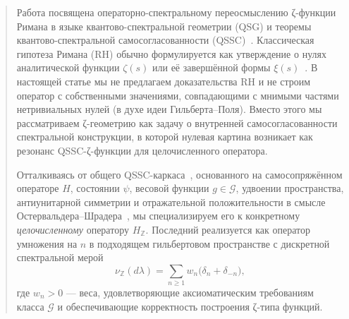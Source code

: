 \documentclass{article}
\numberwithin{equation}{section}
\theoremstyle{plain}
\theoremstyle{definition}
\theoremstyle{remark}
\def\delta{δ}\def\Delta{Δ}\def\epsilon{ε}\def\zeta{ζ}%
\begin{document}
\begin{abstract}
\noindent
Работа посвящена операторно-спектральному переосмыслению ζ-функции Римана в языке квантово-спектральной геометрии (QSG) и теоремы квантово-спектральной самосогласованности (QSSC)~\cite{ReedSimonI,ReedSimonII,Connes1994,Monakhov-QSG-002}. 
Классическая гипотеза Римана (RH) обычно формулируется как утверждение о нулях аналитической функции $\zeta(s)$ или её завершённой формы $\xi(s)$~\cite{Titchmarsh1986,IwaniecKowalski}. 
В настоящей статье мы не предлагаем доказательства RH и не строим оператор с собственными значениями, совпадающими с мнимыми частями нетривиальных нулей (в духе идеи Гильберта–Поля). 
Вместо этого мы рассматриваем ζ-геометрию как задачу о внутренней самосогласованности спектральной конструкции, в которой нулевая картина возникает как резонанс QSSC-ζ-функции для целочисленного оператора.

Отталкиваясь от общего QSSC-каркаса~\cite{Monakhov-QSG-002}, основанного на самосопряжённом операторе $H$, состоянии $\psi$, весовой функции $g\in\mathcal G$, удвоении пространства, антиунитарной симметрии и отражательной положительности в смысле Остервальдера–Шрадера~\cite{OsterwalderSchrader1973}, мы специализируем его к конкретному \emph{целочисленному} оператору $H_{\mathbb Z}$. 
Последний реализуется как оператор умножения на $n$ в подходящем гильбертовом пространстве с дискретной спектральной мерой
\begin{equation}
\label{eq:nuZ-abstract}
\nu_{\mathbb Z}(d\lambda)
=\sum_{n\ge1}w_n\bigl(\delta_n+\delta_{-n}\bigr),
\end{equation}
где $w_n>0$ — веса, удовлетворяющие аксиоматическим требованиям класса $\mathcal G$ и обеспечивающие корректность построения ζ-типа функций.


\end{abstract}
\end{document}
